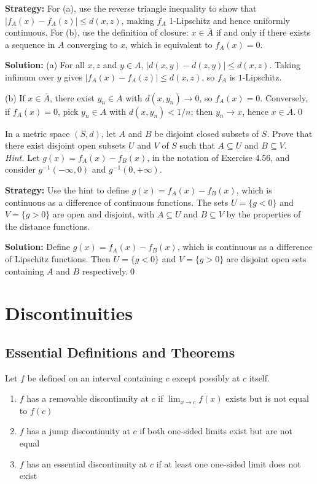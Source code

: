 \noindent\textbf{Strategy:} For (a), use the reverse triangle inequality to show that $|f_A(x) - f_A(z)| \leq d(x,z)$, making $f_A$ 1-Lipschitz and hence uniformly continuous. For (b), use the definition of closure: $x \in \overline{A}$ if and only if there exists a sequence in $A$ converging to $x$, which is equivalent to $f_A(x) = 0$.

\bigskip\noindent\textbf{Solution:}
(a) For all $x,z$ and $y\in A$, $|d(x,y)-d(z,y)|\le d(x,z)$. Taking infimum over $y$ gives $|f_A(x)-f_A(z)|\le d(x,z)$, so $f_A$ is $1$-Lipschitz.

(b) If $x\in\overline{A}$, there exist $y_n\in A$ with $d(x,y_n)\to 0$, so $f_A(x)=0$. Conversely, if $f_A(x)=0$, pick $y_n\in A$ with $d(x,y_n)<1/n$; then $y_n\to x$, hence $x\in\overline{A}$.\qed



\begin{problembox}
In a metric space $(S, d)$, let $A$ and $B$ be disjoint closed subsets of $S$. Prove that there exist disjoint open subsets $U$ and $V$ of $S$ such that $A \subseteq U$ and $B \subseteq V$. \\
\textit{Hint.} Let $g(x) = f_A(x) - f_B(x)$, in the notation of Exercise 4.56, and consider $g^{-1}(-\infty, 0)$ and $g^{-1}(0, +\infty)$.
\end{problembox}

\noindent\textbf{Strategy:} Use the hint to define $g(x) = f_A(x) - f_B(x)$, which is continuous as a difference of continuous functions. The sets $U = \{g < 0\}$ and $V = \{g > 0\}$ are open and disjoint, with $A \subseteq U$ and $B \subseteq V$ by the properties of the distance functions.

\bigskip\noindent\textbf{Solution:}
Define $g(x)=f_A(x)-f_B(x)$, which is continuous as a difference of Lipschitz functions. Then $U=\{g<0\}$ and $V=\{g>0\}$ are disjoint open sets containing $A$ and $B$ respectively.\qed

\section{Discontinuities}

\subsection*{Essential Definitions and Theorems}

\begin{definition}
Let $f$ be defined on an interval containing $c$ except possibly at $c$ itself.
\begin{enumerate}
\item $f$ has a removable discontinuity at $c$ if $\lim_{x \to c} f(x)$ exists but is not equal to $f(c)$
\item $f$ has a jump discontinuity at $c$ if both one-sided limits exist but are not equal
\item $f$ has an essential discontinuity at $c$ if at least one one-sided limit does not exist
\end{enumerate}
\end{definition}



